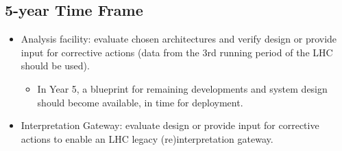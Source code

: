 \documentclass[12pt,a4paper]{article}
\begin{document}
\subsection{5-year Time Frame}

\begin{itemize}
\item Analysis facility: evaluate chosen architectures and verify design or provide input for corrective actions (data from the 3rd running period of the LHC should be used).
\begin{itemize}
\item In Year 5, a blueprint for remaining developments and system design should become available, in time for deployment.
\end{itemize}
\item Interpretation Gateway: evaluate design or provide input for corrective actions to enable an LHC legacy (re)interpretation gateway.
\end{itemize}

\sloppy
\raggedright
\clearpage
\printbibliography[title={References},heading=bibintoc]
\end{document}
